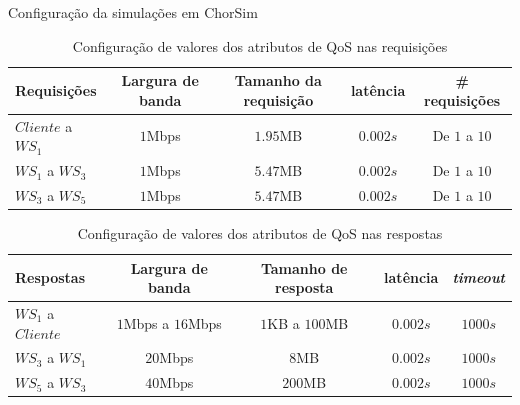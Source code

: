 \documentclass[xcolor=svgnames]{beamer}
\begin{document}
  \begin{frame}{Configuração da simulações em ChorSim}  
      \begin{table}[!h]
	    \centering
      {\footnotesize
	    \caption{Configuração de valores dos atributos de QoS nas requisições}
	    \label{table:simulation_configuration_responses}
	  \begin{tabular}{|l|c|c|c|c|}
		\hline
		Requisições           &  Largura de banda     &   Tamanho da requisição    &  latência       &  \# requisições	  \\
		\hline
		$Cliente$ a $WS_1$    &    $1$Mbps	              &      $1.95$MB        &   $0.002s$      &    De $1$ a $10$     \\
		$WS_1$ a $WS_3$       &    $1$Mbps	              &      $5.47$MB        &   $0.002s$      &    De $1$ a $10$     \\
		$WS_3$ a $WS_5$       &    $1$Mbps                  &      $5.47$MB        &   $0.002s$      &    De $1$ a $10$     \\
		\hline
		\end{tabular}
      }
      \end{table}

      \begin{table}[!h]
	    \centering
      {\footnotesize
	    \caption{Configuração de valores dos atributos de QoS nas respostas}
	    \label{table:simulation_configuration_requests}
	  \begin{tabular}{|l|c|c|c|c|}
		\hline
		Respostas           &  Largura de banda           &   Tamanho de resposta    &  latência         &   \emph{timeout}	  \\
		\hline
		$WS_1$ a $Cliente$  &    $1$Mbps a $16$Mbps	        &    $1$KB a  $100$MB                   &   $0.002s$      &   $1000s$     \\
		$WS_3$ a $WS_1$     &    $20$Mbps	                &      $8$MB                   &   $0.002s$      &   $1000s$     \\
		$WS_5$ a $WS_3$     &    $40$Mbps                 &      $200$MB                 &   $0.002s$      &   $1000s$     \\
		\hline
		\end{tabular}
      }
      \end{table}
  \end{frame}
\end{document}
